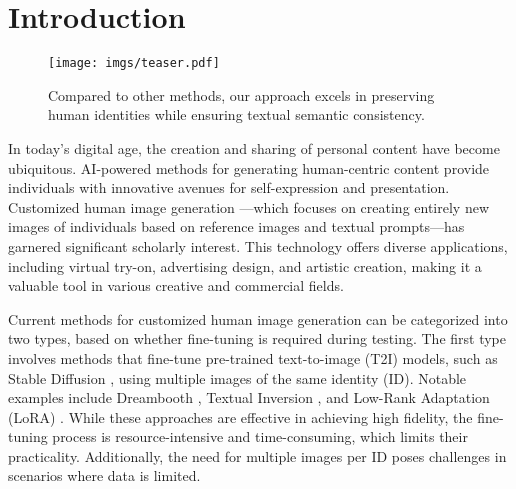 \section{Introduction}

\begin{figure}[t]
    \centering
    \texttt{[image: imgs/teaser.pdf]}
    \caption{
Compared to other methods, our approach excels in preserving human identities while ensuring textual semantic consistency.} %
    \label{fig:teaser} %
\end{figure}

In today's digital age, the creation and sharing of personal content have become ubiquitous. AI-powered methods for generating human-centric content provide individuals with innovative avenues for self-expression and presentation. Customized human image generation \cite{li2024photomaker, xiao2023fastcomposer, wang2024high, wang2024instantid, huang2024consistentid,wu2024infinite,guo2024pulid}—which focuses on creating entirely new images of individuals based on reference images and textual prompts—has garnered significant scholarly interest. This technology offers diverse applications, including virtual try-on, advertising design, and artistic creation, making it a valuable tool in various creative and commercial fields.


Current methods for customized human image generation can be categorized into two types, based on whether fine-tuning is required during testing. The first type involves methods that fine-tune pre-trained text-to-image (T2I) models, such as Stable Diffusion \cite{rombach2022high}, using multiple images of the same identity (ID). Notable examples include Dreambooth \cite{ruiz2023dreambooth}, Textual Inversion \cite{gal2022image}, and Low-Rank Adaptation (LoRA) \cite{hu2021lora}. While these approaches are effective in achieving high fidelity, the fine-tuning process is resource-intensive and time-consuming, which limits their practicality. Additionally, the need for multiple images per ID poses challenges in scenarios where data is limited.

